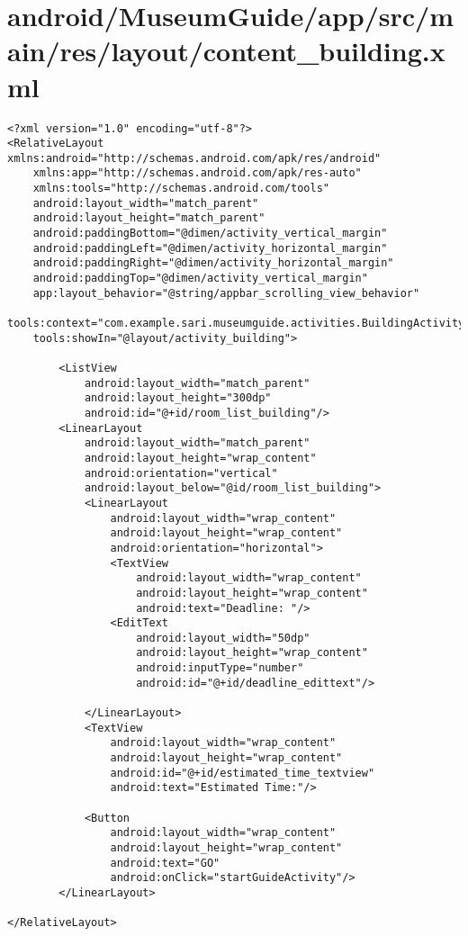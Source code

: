 \section{android/MuseumGuide/app/src/main/res/layout/content_building.xml}
\begin{lstlisting}<?xml version="1.0" encoding="utf-8"?>
<RelativeLayout xmlns:android="http://schemas.android.com/apk/res/android"
    xmlns:app="http://schemas.android.com/apk/res-auto"
    xmlns:tools="http://schemas.android.com/tools"
    android:layout_width="match_parent"
    android:layout_height="match_parent"
    android:paddingBottom="@dimen/activity_vertical_margin"
    android:paddingLeft="@dimen/activity_horizontal_margin"
    android:paddingRight="@dimen/activity_horizontal_margin"
    android:paddingTop="@dimen/activity_vertical_margin"
    app:layout_behavior="@string/appbar_scrolling_view_behavior"
    tools:context="com.example.sari.museumguide.activities.BuildingActivity"
    tools:showIn="@layout/activity_building">

        <ListView
            android:layout_width="match_parent"
            android:layout_height="300dp"
            android:id="@+id/room_list_building"/>
        <LinearLayout
            android:layout_width="match_parent"
            android:layout_height="wrap_content"
            android:orientation="vertical"
            android:layout_below="@id/room_list_building">
            <LinearLayout
                android:layout_width="wrap_content"
                android:layout_height="wrap_content"
                android:orientation="horizontal">
                <TextView
                    android:layout_width="wrap_content"
                    android:layout_height="wrap_content"
                    android:text="Deadline: "/>
                <EditText
                    android:layout_width="50dp"
                    android:layout_height="wrap_content"
                    android:inputType="number"
                    android:id="@+id/deadline_edittext"/>

            </LinearLayout>
            <TextView
                android:layout_width="wrap_content"
                android:layout_height="wrap_content"
                android:id="@+id/estimated_time_textview"
                android:text="Estimated Time:"/>

            <Button
                android:layout_width="wrap_content"
                android:layout_height="wrap_content"
                android:text="GO"
                android:onClick="startGuideActivity"/>
        </LinearLayout>

</RelativeLayout>
\end{lstlisting}
\newpage
